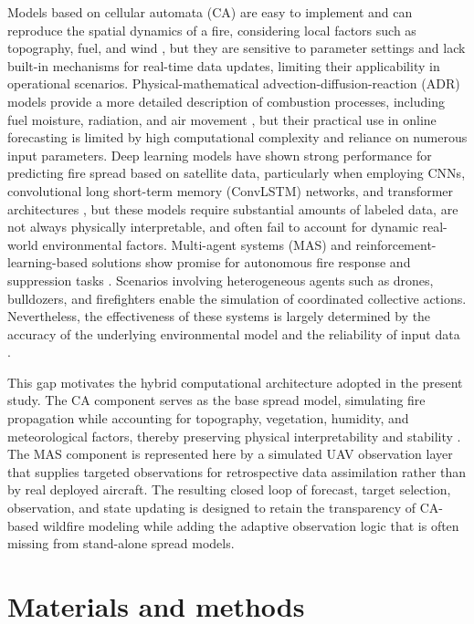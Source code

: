 \documentclass[10pt,letterpaper]{article}
\begin{document}
Models based on cellular automata (CA) are easy to implement and can
reproduce the spatial dynamics of a fire, considering local factors such
as topography, fuel, and wind \cite{freire2019,schumaker2022}, but they are sensitive to parameter settings and lack
built-in mechanisms for real-time data updates, limiting their
applicability in operational scenarios. Physical-mathematical
advection-diffusion-reaction (ADR) models provide a more detailed
description of combustion processes, including fuel moisture, radiation,
and air movement \cite{navasmontilla2025}, but their practical
use in online forecasting is limited by high computational complexity
and reliance on numerous input parameters. Deep learning models have
shown strong performance for predicting fire spread based on satellite
data, particularly when employing CNNs, convolutional long short-term
memory (ConvLSTM) networks, and transformer architectures
\cite{andrianarivony2024,marjani2023}, but these models require substantial
amounts of labeled data, are not always physically interpretable, and
often fail to account for dynamic real-world environmental factors.
Multi-agent systems (MAS) and reinforcement-learning-based
solutions show promise for autonomous fire response and suppression
tasks \cite{partheepan2023,ausonio2021,ramadan2024}. Scenarios involving
heterogeneous agents such as drones, bulldozers, and firefighters enable
the simulation of coordinated collective actions. Nevertheless, the
effectiveness of these systems is largely determined by the accuracy of
the underlying environmental model and the reliability of input data
\cite{ramadan2024}.

This gap motivates the hybrid computational architecture adopted in the
present study. The CA component serves as the base spread model,
simulating fire propagation while accounting for topography,
vegetation, humidity, and meteorological factors, thereby preserving
physical interpretability and stability \cite{schumaker2022}. The MAS
component is represented here by a simulated UAV observation layer that
supplies targeted observations for retrospective data assimilation
rather than by real deployed aircraft. The resulting closed loop of
forecast, target selection, observation, and state updating is designed
to retain the transparency of CA-based wildfire modeling while adding
the adaptive observation logic that is often missing from stand-alone
spread models.

\section*{Materials and methods}
\end{document}

